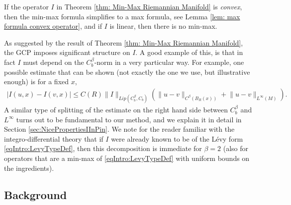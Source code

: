 \documentclass[11pt,reqno]{amsart}
\numberwithin{equation}{section}
\theoremstyle{plain}
\newcommand{\abs}[1]{\left| #1 \right|}
\newcommand{\norm}[1]{\lVert#1\rVert}
\begin{document}
\begin{rem}
  If the operator $I$ in Theorem \ref{thm: Min-Max Riemannian Manifold} is \emph{convex}, then the min-max formula simplifies to a max formula, see Lemma \ref{lem: max formula convex operator}, and if $I$ is linear, then there is no min-max.
\end{rem}

\begin{rem}
	As suggested by the result of Theorem \ref{thm: Min-Max Riemannian Manifold}, the GCP imposes significant structure on $I$.  A good example of this, is that in fact $I$ must depend on the $C^\beta_b$-norm in a very particular way.  For example, one possible estimate that can be shown (not exactly the one we use, but illustrative enough) is for a fixed $x$,
	\begin{align*}
		\abs{I(u,x)-I(v,x)}\leq C(R)\norm{I}_{Lip(C^\beta_b,C_b)}\left( 
		 \norm{u-v}_{C^\beta(B_R(x))} + \norm{u-v}_{L^\infty(M)}
			 \right).
	\end{align*} 
	A similar type of splitting of the estimate on the right hand side between $C^\beta_b$ and $L^\infty$ turns out to be fundamental to our method, and we explain it in detail in Section \ref{sec:NicePropertiesIInPin}.  We note for the reader familiar with the integro-differential theory that if $I$ were already known to be of the L\'evy form \eqref{eqIntro:LevyTypeDef}, then this decomposition is immediate for $\beta=2$ (also for operators that are a min-max of \eqref{eqIntro:LevyTypeDef} with uniform bounds on the ingredients).
\end{rem}



\subsection{Background}\label{sec:Background} 
\end{document}
